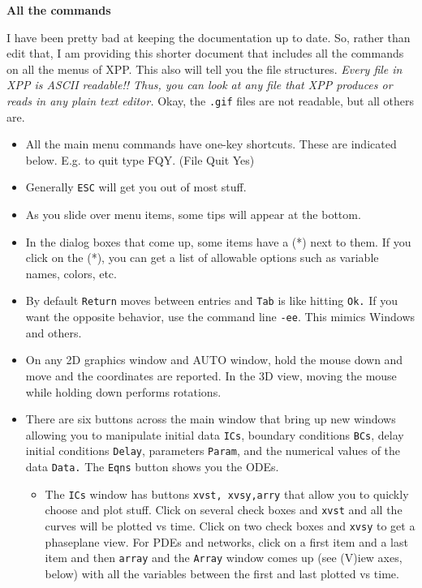 \documentclass{article}
\begin{document}
\begin{center}
{\Huge \bf All the commands }
\end{center}
I have been pretty bad at keeping the documentation up to date. So, rather than edit that, I am providing this shorter document that includes all the commands on all the menus of XPP. This also will tell you the file structures. {\em Every file in XPP is ASCII readable!! Thus, you can look at any file that XPP produces or reads in any plain text editor.} Okay, the {\tt .gif} files are not readable, but all others are.  
 
\begin{itemize}
\item All the main menu commands have one-key shortcuts. These are indicated below. E.g. to quit type FQY.  (File Quit Yes)
\item Generally {\tt ESC} will get you out of most stuff. 
\item As you slide over menu items, some tips will appear at the bottom. 
\item  In the dialog boxes that come up, some items have a (*) next to them. If you click on the (*), you can get a list of allowable options such as variable names, colors, etc.
\item By default {\tt Return} moves between entries and {\tt Tab} is like hitting {\tt Ok.} If you want the opposite behavior, use the command line {\tt -ee}.  This mimics Windows and others.  
\item On any 2D graphics window and AUTO window, hold the mouse down and move and the coordinates are reported. In the 3D view, moving the mouse while holding down performs rotations.
\item There are six buttons across the main window that bring up new windows allowing you to manipulate initial data {\tt ICs}, boundary conditions {\tt BCs}, delay initial conditions {\tt Delay}, parameters {\tt Param}, and the numerical values of the data {\tt Data.} The {\tt Eqns} button shows you the ODEs. 
\begin{itemize}
\item The {\tt ICs} window has buttons {\tt xvst, xvsy,arry} that allow you to quickly choose and plot stuff. Click on several check boxes and {\tt xvst} and all the curves will be plotted vs time. Click on two check boxes and {\tt xvsy} to get a phaseplane view. For PDEs and networks, click on a first item and a last item and then {\tt array} and the {\tt Array} window comes up (see (V)iew axes, below) with all the variables between the first and last plotted vs time.

\end{itemize}
\end{itemize}
\end{document}
